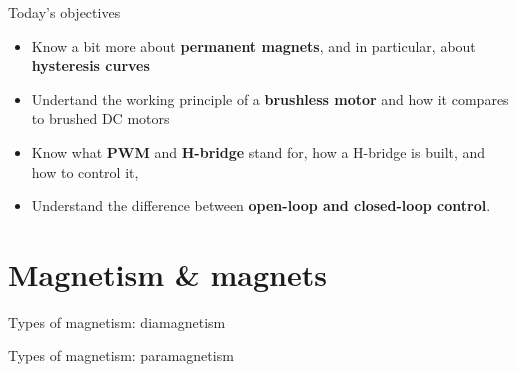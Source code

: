 \documentclass[compress]{beamer}
\makeatletter
\let\beamer@writeslidentry@miniframeson=\beamer@writeslidentry
\newcommand*{\miniframeson}{\let\beamer@writeslidentry=\beamer@writeslidentry@miniframeson}
\makeatother
\begin{document}
\begin{frame}{Today's objectives}

    \begin{itemize}
        \item Know a bit more about \textbf{permanent magnets}, and in particular, about
            \textbf{hysteresis curves}
        \item Undertand the working principle of a \textbf{brushless motor} and
            how it compares to brushed DC motors
        \item Know what \textbf{PWM} and \textbf{H-bridge} stand for, how a H-bridge is built, and
            how to control it,
        \item Understand the difference between \textbf{open-loop and closed-loop
            control}.

    \end{itemize}
\end{frame}

\miniframeson


\section[Magnets]{Magnetism \& magnets}

{
\begin{frame}{Types of magnetism: diamagnetism}

\end{frame}
}

{
\begin{frame}{Types of magnetism: paramagnetism}

\end{frame}
}
\end{document}
